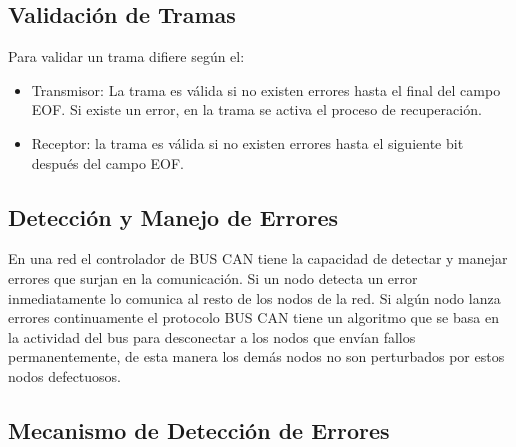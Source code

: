 \subsection{Validación de Tramas}

Para validar un trama difiere según el:

\begin {itemize}
\item Transmisor: La trama es válida si no existen errores hasta el final del campo EOF. Si existe un error, en la trama se activa el proceso de recuperación.
\item Receptor: la trama es válida si no existen errores hasta el siguiente bit después del campo EOF.
\end{itemize}


\subsection{Detección y Manejo de Errores}

En una red el controlador de BUS CAN tiene la capacidad de detectar y manejar errores que surjan en la comunicación. Si un nodo detecta un error inmediatamente lo comunica al resto de  los nodos de la red. Si algún nodo lanza errores continuamente el protocolo BUS CAN tiene un algoritmo que se basa en la actividad del bus para desconectar a los nodos que envían fallos permanentemente, de esta manera los demás nodos no son perturbados por estos nodos defectuosos.

\subsection{Mecanismo de Detección de Errores}

